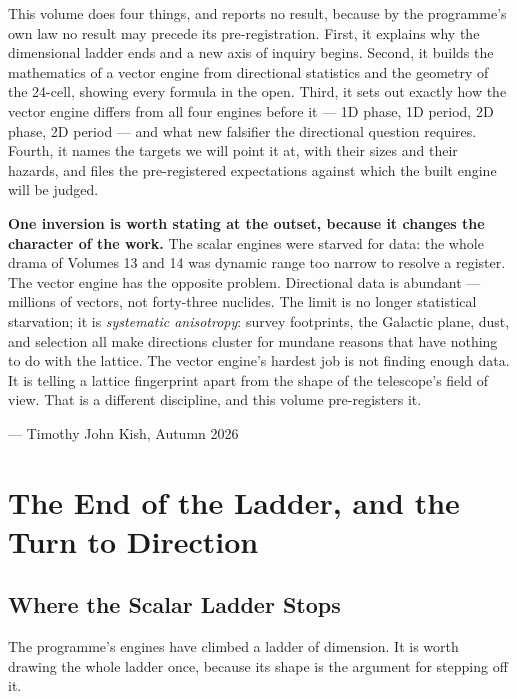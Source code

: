 \documentclass[11pt, letterpaper, openany]{book}
\begin{document}
This volume does four things, and reports no result, because by the programme's own law no result may
precede its pre-registration. First, it explains why the dimensional ladder ends and a new axis of
inquiry begins. Second, it builds the mathematics of a vector engine from directional statistics and
the geometry of the 24-cell, showing every formula in the open. Third, it sets out exactly how the
vector engine differs from all four engines before it --- 1D phase, 1D period, 2D phase, 2D period ---
and what new falsifier the directional question requires. Fourth, it names the targets we will point it
at, with their sizes and their hazards, and files the pre-registered expectations against which the
built engine will be judged.

\begin{warningbox}
\textbf{One inversion is worth stating at the outset, because it changes the character of the work.}
The scalar engines were starved for data: the whole drama of Volumes 13 and 14 was dynamic range too
narrow to resolve a register. The vector engine has the opposite problem. Directional data is
abundant --- millions of vectors, not forty-three nuclides. The limit is no longer statistical
starvation; it is \emph{systematic anisotropy}: survey footprints, the Galactic plane, dust, and
selection all make directions cluster for mundane reasons that have nothing to do with the lattice.
The vector engine's hardest job is not finding enough data. It is telling a lattice fingerprint apart
from the shape of the telescope's field of view. That is a different discipline, and this volume
pre-registers it.
\end{warningbox}

\vspace{1em}
\noindent\hfill --- Timothy John Kish, Autumn 2026

\chapter{The End of the Ladder, and the Turn to Direction}

\section{Where the Scalar Ladder Stops}

The programme's engines have climbed a ladder of dimension. It is worth drawing the whole ladder once,
because its shape is the argument for stepping off it.
\end{document}
